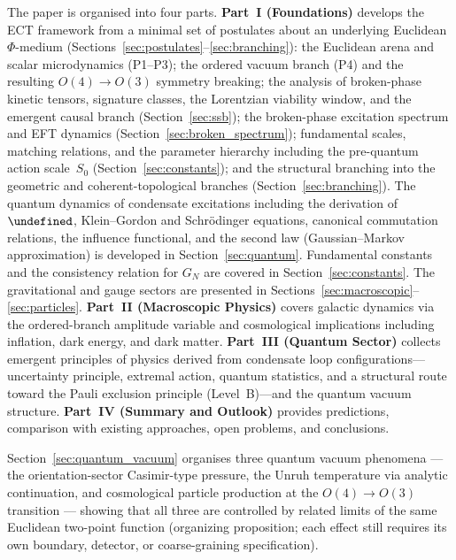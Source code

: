 \documentclass[11pt,a4paper]{article}
\let\hbar\undefined
\numberwithin{equation}{section}
\begin{document}
The paper is organised into four parts.
\textbf{Part~I (Foundations)} develops the ECT framework from a
minimal set of postulates about an underlying Euclidean $\Phi$-medium
(Sections~\ref{sec:postulates}--\ref{sec:branching}):
the Euclidean arena and scalar microdynamics (P1--P3);
the ordered vacuum branch (P4) and the resulting
$O(4)\to O(3)$ symmetry breaking;
the analysis of broken-phase kinetic tensors, signature classes,
the Lorentzian viability window, and the emergent causal branch
(Section~\ref{sec:ssb});
the broken-phase excitation spectrum and EFT dynamics
(Section~\ref{sec:broken_spectrum});
fundamental scales, matching relations, and the parameter hierarchy
including the pre-quantum action scale~$S_0$ (Section~\ref{sec:constants});
and the structural branching into the geometric and
coherent-topological branches (Section~\ref{sec:branching}).
The quantum dynamics of condensate excitations including the
derivation of $\hbar$, Klein--Gordon and Schr\"odinger equations,
canonical commutation relations, the influence functional, and
the second law (Gaussian--Markov approximation) is developed in
Section~\ref{sec:quantum}.
Fundamental constants and the consistency relation for $G_N$
are covered in Section~\ref{sec:constants}.
The gravitational and gauge sectors are presented in
Sections~\ref{sec:macroscopic}--\ref{sec:particles}.
\textbf{Part~II (Macroscopic Physics)} covers galactic dynamics
via the ordered-branch amplitude variable and cosmological implications
including inflation, dark energy, and dark matter.
\textbf{Part~III (Quantum Sector)} collects emergent principles
of physics derived from condensate loop configurations---uncertainty
principle, extremal action, quantum statistics, and a structural
route toward the Pauli exclusion principle (Level~B)---and the
quantum vacuum structure.
\textbf{Part~IV (Summary and Outlook)} provides predictions,
comparison with existing approaches, open problems,
and conclusions.

Section~\ref{sec:quantum_vacuum}
organises three quantum vacuum phenomena --- the orientation-sector
Casimir-type pressure, the Unruh temperature via analytic continuation,
and cosmological particle production at the $O(4)\to O(3)$ transition ---
showing that all three are controlled by related limits of the same Euclidean
two-point function (organizing proposition; each effect still requires
its own boundary, detector, or coarse-graining specification).
\end{document}
